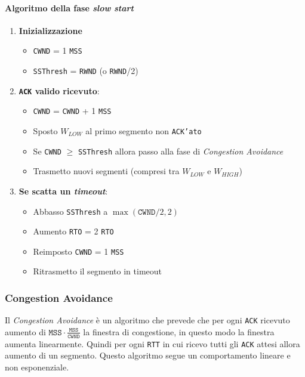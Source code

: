             \paragraph{Algoritmo della fase \textit{slow start}}
            \begin{enumerate}
                \item \textbf{Inizializzazione} \begin{itemize}
                    \item \texttt{CWND} = 1 \texttt{MSS}
                    \item \texttt{SSThresh} = \texttt{RWND} (o \texttt{RWND}/2)
                \end{itemize}
                \item \textbf{\texttt{ACK} valido ricevuto}:\begin{itemize}
                    \item \texttt{CWND} = \texttt{CWND} + 1 \texttt{MSS}
                    \item Sposto $W_{LOW}$ al primo segmento non \texttt{ACK'ato}
                    \item Se \texttt{CWND} $ \geq $ \texttt{SSThresh} allora passo alla fase di \textit{Congestion Avoidance}
                    \item Trasmetto nuovi segmenti (compresi tra $W_{LOW}$ e $W_{HIGH}$)
                \end{itemize}
                \item \textbf{Se scatta un \textit{timeout}}: \begin{itemize}
                    \item Abbasso \texttt{SSThresh} a $\max(\texttt{CWND}/2, 2)$
                    \item Aumento \texttt{RTO} = 2 \texttt{RTO}
                    \item Reimposto \texttt{CWND} = 1 \texttt{MSS}
                    \item Ritrasmetto il segmento in timeout 
                \end{itemize}
            \end{enumerate}
            \subsubsection{Congestion Avoidance}
            Il \textit{Congestion Avoidance} è un algoritmo che prevede che per ogni \texttt{ACK} ricevuto aumento di $ \texttt{MSS}\cdot \frac{\texttt{MSS}}{\texttt{CWND}} $ la finestra di congestione, in questo modo la finestra aumenta linearmente. Quindi per ogni \texttt{RTT} in cui ricevo tutti gli \texttt{ACK} attesi allora aumento di un segmento. Questo algoritmo segue un comportamento lineare e non esponenziale.
